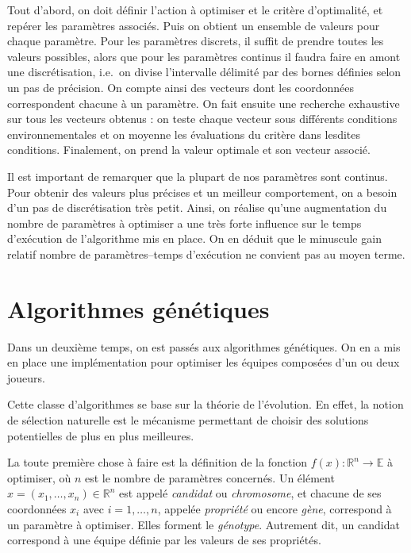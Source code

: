 \documentclass[12pt,a4paper]{article}
\begin{document}
Tout d'abord, on doit d\'efinir l'action \`a optimiser et le crit\`ere 
d'optimalit\'e, et rep\'erer les param\`etres associ\'es. Puis on 
obtient un ensemble de valeurs pour chaque param\`etre. 
Pour les param\`etres discrets, il suffit de prendre toutes les valeurs 
possibles, alors que pour les param\`etres continus il faudra faire en amont 
une discr\'etisation, i.e.\ on divise l'intervalle d\'elimit\'e par des bornes 
d\'efinies selon un pas de pr\'ecision. On compte ainsi des vecteurs dont les 
coordonn\'ees correspondent chacune \`a un param\`etre. On fait ensuite une 
recherche exhaustive sur tous les vecteurs obtenus : on teste chaque vecteur 
sous diff\'erents conditions environnementales et on moyenne les \'evaluations 
 du crit\`ere dans lesdites conditions. Finalement, on prend la valeur optimale 
et son vecteur associ\'e.

Il est important de remarquer que la plupart de nos param\`etres sont continus. 
Pour obtenir des valeurs plus pr\'ecises et un meilleur comportement, on a 
besoin d'un pas de discr\'etisation tr\`es petit. Ainsi, on r\'ealise qu'une 
augmentation du nombre de param\`etres \`a optimiser a une tr\`es forte 
influence sur le temps d'ex\'ecution de l'algorithme mis en place. On en 
d\'eduit que le minuscule gain relatif nombre de param\`etres--temps 
d'ex\'ecution ne convient pas au moyen terme.

\section{Algorithmes g\'en\'etiques}
Dans un deuxi\`eme temps, on est pass\'es aux algorithmes g\'en\'etiques. On en 
a mis en place une impl\'ementation pour optimiser les \'equipes compos\'ees 
d'un ou deux joueurs.

Cette classe d'algorithmes se base sur la th\'eorie de l'\'evolution. En effet, 
la notion de s\'election naturelle est le m\'ecanisme permettant de choisir des 
solutions potentielles de plus en plus meilleures.

La toute premi\`ere chose \`a faire est la d\'efinition de la fonction 
$f(x): \mathbb{R}^n \to \mathbb{E}$ \`a optimiser, o\`u $n$ est le nombre de 
param\`etres concern\'es. Un \'el\'ement $x=(x_1,\dotsc,x_n) \in \mathbb{R}^n$ 
est appel\'e {\itshape candidat} ou {\itshape chromosome}, et chacune de ses 
coordonn\'ees $x_i$ avec $i=1,\dotsc,n$, appel\'ee {\itshape propri\'et\'e} 
ou encore {\itshape g\`ene}, correspond \`a un param\`etre \`a optimiser. Elles 
forment le {\itshape g\'enotype}.
Autrement dit, un candidat correspond \`a une \'equipe d\'efinie par les valeurs
de ses propri\'et\'es.
\end{document}
